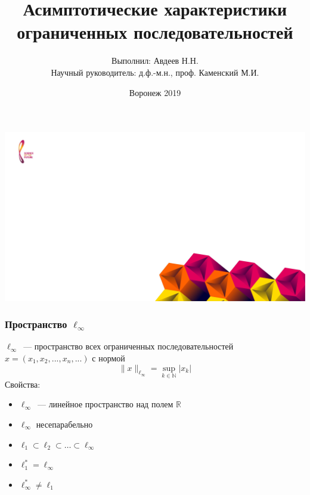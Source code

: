 \documentclass[10pt,pdf,hyperref={unicode},aspectratio=169]{beamer}
\theoremstyle{definition}
\begin{document}
{
	
}
{\includegraphics[width=\paperwidth,height=\paperheight,keepaspectratio]{bg.jpg}}


\title{Асимптотические характеристики \\ ограниченных последовательностей}
\author{Выполнил: Авдеев Н.Н. \\ Научный руководитель: д.ф.-м.н., проф. Каменский М.И.}
\date{Воронеж 2019}

\maketitle


\begin{frame}
	\frametitle{Пространство $\ell_\infty$}
	$\ell_\infty$~--- пространство всех ограниченных последовательностей
	$x=(x_1, x_2, ..., x_n, ...)$
	с нормой
	$$
		\|x\|_{\ell_\infty} = \sup_{k\in\mathbb{N}} |x_k|
	$$
	{Свойства:}

	\begin{itemize}
		\item
			$\ell_\infty$~--- линейное пространство над полем $\mathbb{R}$
		\item
			$\ell_\infty$  несепарабельно
		\item
			$\ell_1 \subset \ell_2 \subset \dots \subset \ell_\infty$
		\item
			$\ell_1^* = \ell_\infty$
		\item
			$\ell_\infty^* \neq \ell_1$
	\end{itemize}
\end{frame}
\end{document}
